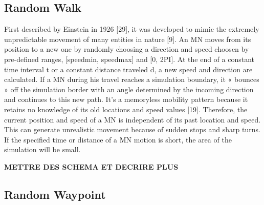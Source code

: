 \subsection{Random Walk}

First described by Einstein in 1926 [29], it was developed to mimic the extremely unpredictable movement of many entities in nature [9]. An MN moves from its position to a new one by randomly choosing a direction and speed choosen by pre-defined ranges, [speedmin, speedmax] and [0, 2PI]. At the end of a constant time interval t or a constant distance traveled d, a new speed and direction are calculated. If a MN during his travel reaches a simulation boundary, it « bounces » off the simulation border with an angle determined by the incoming direction and continues to this new path.
It's a memoryless mobility pattern because it retains no knowledge of its old locations and speed values [19]. Therefore, the current position and speed of a MN is independent of its past location and speed. This can generate unrealistic movement because of sudden stops and sharp turns. If the specified time or distance of a MN motion is short, the area of the simulation will be small.

\textbf{METTRE DES SCHEMA ET DECRIRE PLUS}

\subsection{Random Waypoint}

